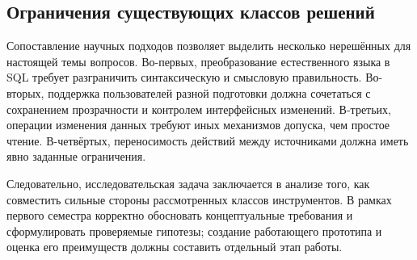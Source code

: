 \subsection{Ограничения существующих классов решений}

Сопоставление научных подходов позволяет выделить несколько нерешённых для настоящей темы вопросов. Во-первых, преобразование естественного языка в SQL требует разграничить синтаксическую и смысловую правильность. Во-вторых, поддержка пользователей разной подготовки должна сочетаться с сохранением прозрачности и контролем интерфейсных изменений. В-третьих, операции изменения данных требуют иных механизмов допуска, чем простое чтение. В-четвёртых, переносимость действий между источниками должна иметь явно заданные ограничения.

Следовательно, исследовательская задача заключается в анализе того, как совместить сильные стороны рассмотренных классов инструментов. В рамках первого семестра корректно обосновать концептуальные требования и сформулировать проверяемые гипотезы; создание работающего прототипа и оценка его преимуществ должны составить отдельный этап работы.